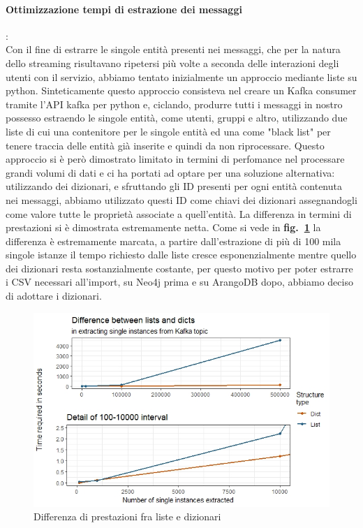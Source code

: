 \documentclass[fleqn,10pt]{SelfArx} %
\begin{document}
{{\paragraph{Ottimizzazione tempi di estrazione dei messaggi}:  \\ Con il fine di estrarre le singole entità presenti nei messaggi, che per la natura dello streaming risultavano ripetersi più volte a seconda delle interazioni degli utenti con il servizio, abbiamo tentato inizialmente un approccio mediante liste su python. Sinteticamente questo approccio consisteva nel creare un Kafka consumer tramite l'API kafka per python e, ciclando, produrre tutti i messaggi in nostro possesso estraendo le singole entità, come utenti, gruppi e altro, utilizzando due liste di cui una contenitore per le singole entità ed una come "black list" per tenere traccia delle entità già inserite e quindi da non riprocessare. Questo approccio si è però dimostrato limitato in termini di perfomance nel processare grandi volumi di dati e ci ha portati ad optare per una soluzione alternativa: utilizzando dei dizionari, e sfruttando gli ID presenti per ogni entità contenuta nei messaggi, abbiamo utilizzato questi ID come chiavi dei dizionari assegnandogli come valore tutte le proprietà associate a quell'entità. La differenza in termini di prestazioni si è dimostrata estremamente netta. Come si vede in \textbf{fig.~\ref{plot_lists_dicts}} la differenza è estremamente marcata, a partire dall'estrazione di più di 100 mila singole istanze il tempo richiesto dalle liste cresce esponenzialmente mentre quello dei dizionari resta sostanzialmente costante, per questo motivo per poter estrarre i CSV necessari all'import, su Neo4j prima e su ArangoDB dopo, abbiamo deciso di adottare i dizionari.
\begin{figure}
\centering
\includegraphics[scale=0.54]{viz_benchmark_lists_dicts.jpeg}
\caption{\label{plot_lists_dicts} Differenza di prestazioni fra liste e dizionari}
\end{figure}
}}
\end{document}

